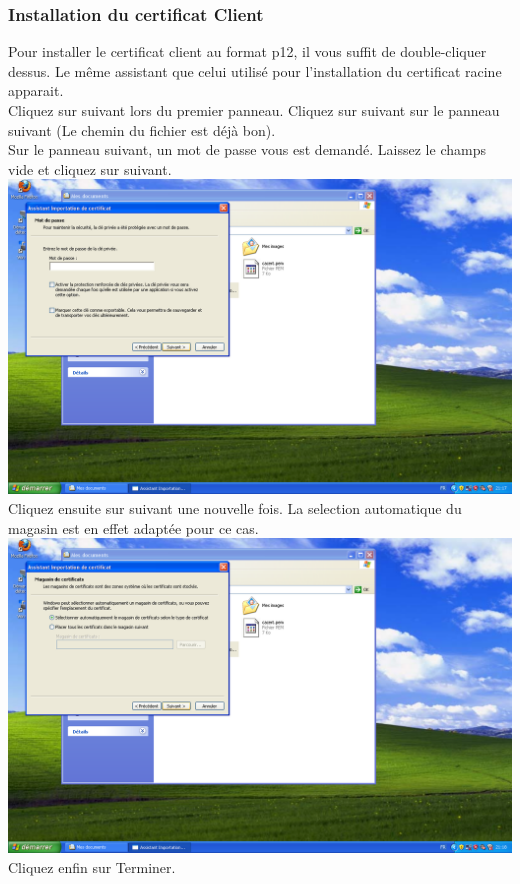 \subsubsection{Installation du certificat Client}
Pour installer le certificat client au format p12, il vous suffit de double-cliquer dessus. Le même assistant que celui utilisé pour l'installation du certificat racine apparait.\\
Cliquez sur suivant lors du premier panneau. Cliquez sur suivant sur le panneau suivant (Le chemin du fichier est déjà bon).\\
Sur le panneau suivant, un mot de passe vous est demandé. Laissez le champs vide et cliquez sur suivant.\\
\includegraphics[width=\screenShotSize{}]{img/importClient.PNG}\\
Cliquez ensuite sur suivant une nouvelle fois. La selection automatique du magasin est en effet adaptée pour ce cas. \\
\includegraphics[width=\screenShotSize{}]{img/importClient2.PNG}\\
Cliquez enfin sur Terminer.\\

